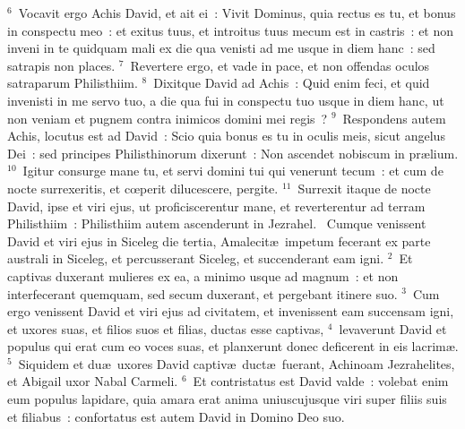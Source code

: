 ${}^{6}$~Vocavit ergo Achis David, et ait ei~: Vivit Dominus, quia rectus es tu, et bonus in conspectu meo~: et exitus tuus, et introitus tuus mecum est in castris~: et non inveni in te quidquam mali ex die qua venisti ad me usque in diem hanc~: sed satrapis non places.
${}^{7}$~Revertere ergo, et vade in pace, et non offendas oculos satraparum Philisthiim.
${}^{8}$~Dixitque David ad Achis~: Quid enim feci, et quid invenisti in me servo tuo, a die qua fui in conspectu tuo usque in diem hanc, ut non veniam et pugnem contra inimicos domini mei regis~?
${}^{9}$~Respondens autem Achis, locutus est ad David~: Scio quia bonus es tu in oculis meis, sicut angelus Dei~: sed principes Philisthinorum dixerunt~: Non ascendet nobiscum in pr\ae lium.
${}^{10}$~Igitur consurge mane tu, et servi domini tui qui venerunt tecum~: et cum de nocte surrexeritis, et cœperit dilucescere, pergite.
${}^{11}$~Surrexit itaque de nocte David, ipse et viri ejus, ut proficiscerentur mane, et reverterentur ad terram Philisthiim~: Philisthiim autem ascenderunt in Jezrahel.
~\lettrine[lines=10,image=true,loversize=0.05,lraise=-0.03]{C}{}umque venissent David et viri ejus in Siceleg die tertia, Amalecit\ae\ impetum fecerant ex parte australi in Siceleg, et percusserant Siceleg, et succenderant eam igni.
${}^{2}$~Et captivas duxerant mulieres ex ea, a minimo usque ad magnum~: et non interfecerant quemquam, sed secum duxerant, et pergebant itinere suo.
${}^{3}$~Cum ergo venissent David et viri ejus ad civitatem, et invenissent eam succensam igni, et uxores suas, et filios suos et filias, ductas esse captivas,
${}^{4}$~levaverunt David et populus qui erat cum eo voces suas, et planxerunt donec deficerent in eis lacrim\ae .
${}^{5}$~Siquidem et du\ae\ uxores David captiv\ae\ duct\ae\ fuerant, Achinoam Jezrahelites, et Abigail uxor Nabal Carmeli.
${}^{6}$~Et contristatus est David valde~: volebat enim eum populus lapidare, quia amara erat anima uniuscujusque viri super filiis suis et filiabus~: confortatus est autem David in Domino Deo suo.


